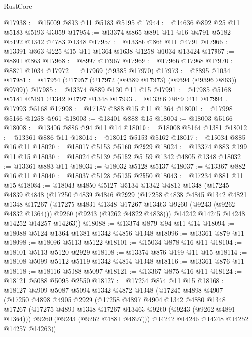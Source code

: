 \begin{lexlean}{RustCore}
\begin{coremodule}
@17938 := @15009 @893 @11 @5183 @5195
@17944 := @14636 @892 @25 @11 @5183 @5193 @3059
@17954 := @13374 @865 @891 @11 @16 @4791 @5182 @5192 @1342 @4783 @1348
@17957 := @13386 @865 @11 @4791
@17966 := @13391 @863 @225 @15 @11 @1364 @1638 @1258 @1034 @13424
@17967 := @8801 @863
@17968 := @8997 @17967
@17969 := @17966 @17968
@17970 := @8871 @1034
@17972 := @17969 (@9385 @17970)
@17973 := @8895 @1034
@17981 := @17954 (@17957 (@17972 (@9389 @17973) (@9394 (@9396 @863)) @9709))
@17985 := @13374 @889 @130 @11 @15
@17991 := @17985 @5168 @5181 @5191 @1342 @4797 @1348
@17993 := @13386 @889 @11
@17994 := @17993 @5168
@17998 := @17187 @888 @15 @11 @1364
@18001 := @17998 @5166 @1258 @961
@18003 := @13401 @888 @15
@18004 := @18003 @5166
@18008 := @13406 @886 @94 @11 @14
@18010 := @18008 @5164 @1381
@18012 := @13361 @886 @11
@18014 := @18012 @5153 @5162
@18017 := @15034 @885 @16 @11
@18020 := @18017 @5153 @5160 @2929
@18024 := @13374 @883 @199 @11 @15
@18030 := @18024 @5139 @5152 @5159 @1342 @4805 @1348
@18032 := @13361 @883 @11
@18034 := @18032 @5128 @5137
@18037 := @13367 @882 @16 @11
@18040 := @18037 @5128 @5135 @2550
@18043 := @17234 @881 @11 @15
@18084 := @18043
    @4850
    @5127
    @5134
    @1342
    @4813
    @1348
    (@17245
      @4839
      @4848
      (@17250
        @4839
        @4846
        @2929
        (@17258
          @4838
          @4845
          @1342
          @4821
          @1348
          @17267
          (@17275 @4831 @1348 @17267 @13463 @9260 (@9243 (@9262 @4832 @1364)))
          @9260
          (@9243 (@9262 @4822 @4838)))
        @14242
        @14245
        @14248
        @14252
        @14257
        @14263))
@18088 := @13374 @879 @94 @11 @14
@18094 := @18088 @5124 @1364 @1381 @1342 @4856 @1348
@18096 := @13361 @879 @11
@18098 := @18096 @5113 @5122
@18101 := @15034 @878 @16 @11
@18104 := @18101 @5113 @5120 @2929
@18108 := @13374 @876 @199 @11 @15
@18114 := @18108 @5099 @5112 @5119 @1342 @4864 @1348
@18116 := @13361 @876 @11
@18118 := @18116 @5088 @5097
@18121 := @13367 @875 @16 @11
@18124 := @18121 @5088 @5095 @2550
@18127 := @17234 @874 @11 @15
@18168 := @18127
    @4909
    @5087
    @5094
    @1342
    @4872
    @1348
    (@17245
      @4898
      @4907
      (@17250
        @4898
        @4905
        @2929
        (@17258
          @4897
          @4904
          @1342
          @4880
          @1348
          @17267
          (@17275 @4890 @1348 @17267 @13463 @9260 (@9243 (@9262 @4891 @1364)))
          @9260
          (@9243 (@9262 @4881 @4897)))
        @14242
        @14245
        @14248
        @14252
        @14257
        @14263))

\end{coremodule}
\end{lexlean}
